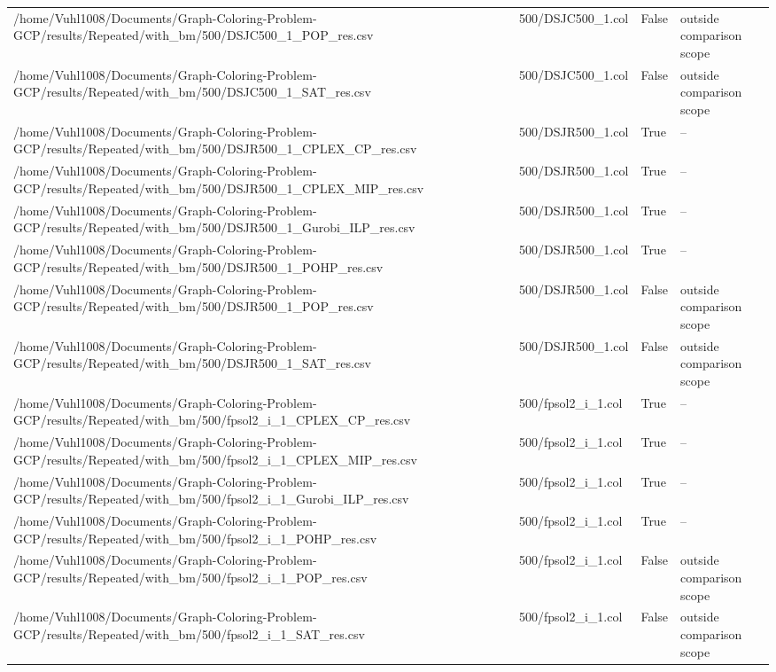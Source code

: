 \begin{table}[htbp]
\begin{tabular}{llll}
/home/Vuhl1008/Documents/Graph-Coloring-Problem-GCP/results/Repeated/with\_bm/500/DSJC500\_1\_POP\_res.csv & 500/DSJC500\_1.col & False & outside comparison scope \\
/home/Vuhl1008/Documents/Graph-Coloring-Problem-GCP/results/Repeated/with\_bm/500/DSJC500\_1\_SAT\_res.csv & 500/DSJC500\_1.col & False & outside comparison scope \\
/home/Vuhl1008/Documents/Graph-Coloring-Problem-GCP/results/Repeated/with\_bm/500/DSJR500\_1\_CPLEX\_CP\_res.csv & 500/DSJR500\_1.col & True & -- \\
/home/Vuhl1008/Documents/Graph-Coloring-Problem-GCP/results/Repeated/with\_bm/500/DSJR500\_1\_CPLEX\_MIP\_res.csv & 500/DSJR500\_1.col & True & -- \\
/home/Vuhl1008/Documents/Graph-Coloring-Problem-GCP/results/Repeated/with\_bm/500/DSJR500\_1\_Gurobi\_ILP\_res.csv & 500/DSJR500\_1.col & True & -- \\
/home/Vuhl1008/Documents/Graph-Coloring-Problem-GCP/results/Repeated/with\_bm/500/DSJR500\_1\_POHP\_res.csv & 500/DSJR500\_1.col & True & -- \\
/home/Vuhl1008/Documents/Graph-Coloring-Problem-GCP/results/Repeated/with\_bm/500/DSJR500\_1\_POP\_res.csv & 500/DSJR500\_1.col & False & outside comparison scope \\
/home/Vuhl1008/Documents/Graph-Coloring-Problem-GCP/results/Repeated/with\_bm/500/DSJR500\_1\_SAT\_res.csv & 500/DSJR500\_1.col & False & outside comparison scope \\
/home/Vuhl1008/Documents/Graph-Coloring-Problem-GCP/results/Repeated/with\_bm/500/fpsol2\_i\_1\_CPLEX\_CP\_res.csv & 500/fpsol2\_i\_1.col & True & -- \\
/home/Vuhl1008/Documents/Graph-Coloring-Problem-GCP/results/Repeated/with\_bm/500/fpsol2\_i\_1\_CPLEX\_MIP\_res.csv & 500/fpsol2\_i\_1.col & True & -- \\
/home/Vuhl1008/Documents/Graph-Coloring-Problem-GCP/results/Repeated/with\_bm/500/fpsol2\_i\_1\_Gurobi\_ILP\_res.csv & 500/fpsol2\_i\_1.col & True & -- \\
/home/Vuhl1008/Documents/Graph-Coloring-Problem-GCP/results/Repeated/with\_bm/500/fpsol2\_i\_1\_POHP\_res.csv & 500/fpsol2\_i\_1.col & True & -- \\
/home/Vuhl1008/Documents/Graph-Coloring-Problem-GCP/results/Repeated/with\_bm/500/fpsol2\_i\_1\_POP\_res.csv & 500/fpsol2\_i\_1.col & False & outside comparison scope \\
/home/Vuhl1008/Documents/Graph-Coloring-Problem-GCP/results/Repeated/with\_bm/500/fpsol2\_i\_1\_SAT\_res.csv & 500/fpsol2\_i\_1.col & False & outside comparison scope \\

\end{tabular}
\end{table}
